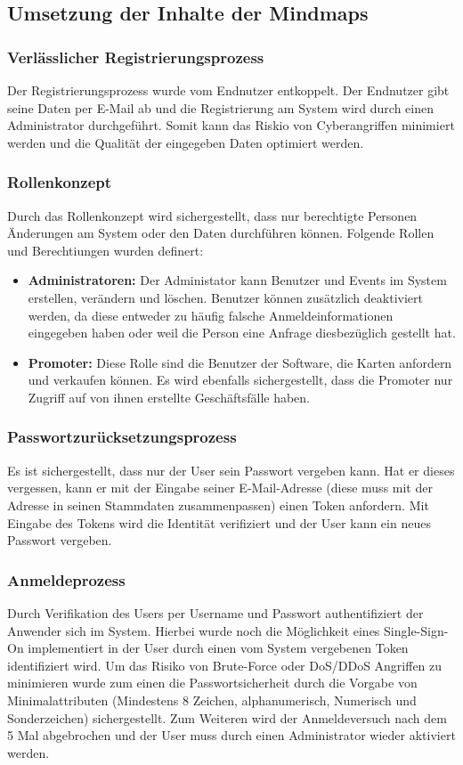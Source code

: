 \subsection{Umsetzung der Inhalte der Mindmaps}
\subsubsection{Verlässlicher Registrierungsprozess}
Der Registrierungsprozess wurde vom Endnutzer entkoppelt. Der Endnutzer gibt seine Daten per E-Mail ab und die Registrierung am System wird durch einen Administrator durchgeführt. Somit kann das Riskio von Cyberangriffen minimiert werden und die Qualität der eingegeben Daten optimiert werden.
\subsubsection{Rollenkonzept}
Durch das Rollenkonzept wird sichergestellt, dass nur berechtigte Personen Änderungen am System oder den Daten durchführen können. Folgende Rollen und Berechtiungen wurden definert: 
\begin{itemize}
	\item \textbf{Administratoren:} Der Administator kann Benutzer und Events im System erstellen, verändern und löschen. Benutzer können zusätzlich deaktiviert werden, da diese entweder zu häufig falsche Anmeldeinformationen eingegeben haben oder weil die Person eine Anfrage diesbezüglich gestellt hat.
	\item \textbf{Promoter:} Diese Rolle sind die Benutzer der Software, die Karten anfordern und verkaufen können. Es wird ebenfalls sichergestellt, dass die Promoter nur Zugriff auf von ihnen erstellte Geschäftsfälle haben.
\end{itemize}

\subsubsection{Passwortzurücksetzungsprozess}
Es ist sichergestellt, dass nur der User sein Passwort vergeben kann. Hat er dieses vergessen, kann er mit der Eingabe seiner E-Mail-Adresse (diese muss mit der Adresse in seinen Stammdaten zusammenpassen) einen Token anfordern. Mit Eingabe des Tokens wird die Identität verifiziert und der User kann ein neues Passwort vergeben.
\subsubsection{Anmeldeprozess}
Durch Verifikation des Users per Username und Passwort authentifiziert der Anwender sich im System. Hierbei wurde noch die Möglichkeit eines Single-Sign-On implementiert in der User durch einen vom System vergebenen Token identifiziert wird. Um das Risiko von Brute-Force oder DoS/DDoS Angriffen zu minimieren wurde zum einen die Passwortsicherheit durch die Vorgabe von Minimalattributen (Mindestens 8 Zeichen, alphanumerisch, Numerisch und Sonderzeichen) sichergestellt. Zum Weiteren wird der Anmeldeversuch nach dem 5 Mal abgebrochen und der User muss durch einen Administrator wieder aktiviert werden.
